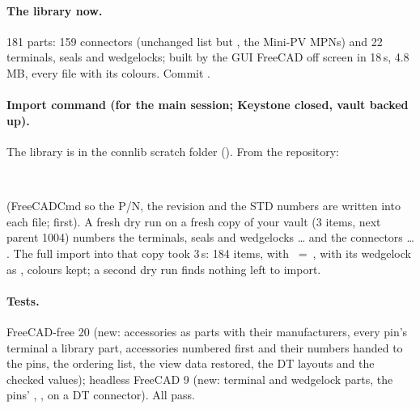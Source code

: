\paragraph{The library now.} 181 parts: 159 connectors (unchanged list but , the Mini-PV MPNs) and 22
terminals, seals and wedgelocks; built by the GUI FreeCAD off screen in 18\,s, 4.8\,MB, every file with its colours.
Commit .

\paragraph{Import command (for the main session; Keystone closed, vault backed up).} The library is in the connlib
scratch folder (). From the repository:
\begin{center}
\small
{}\\
\end{center}
(FreeCADCmd so the P/N, the revision and the STD numbers are written into each file;  first). A fresh
dry run on a fresh copy of your vault (3 items, next parent 1004) numbers the terminals, seals and wedgelocks
 \ldots{}  and the connectors  \ldots{}
. The full import into that copy took 3\,s: 184 items,  with
~=~,  with its wedgelock  as
, colours kept; a second dry run finds nothing left to import.

\paragraph{Tests.} FreeCAD-free 20 (new: accessories as parts with their manufacturers, every pin's terminal a
library part, accessories numbered first and their numbers handed to the pins, the ordering list, the view data
restored, the DT layouts and the checked values); headless FreeCAD 9 (new: terminal and wedgelock parts, the pins'
, ,  on a DT connector). All pass.

